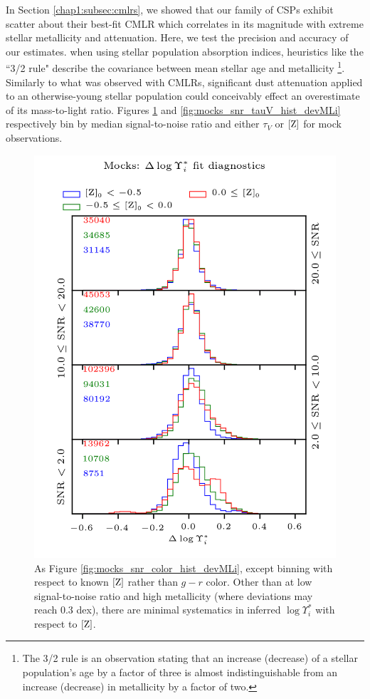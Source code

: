 In Section \ref{chap1:subsec:cmlrs}, we showed that our family of CSPs exhibit scatter about their best-fit CMLR which correlates in its magnitude with extreme stellar metallicity and attenuation. Here, we test the precision and accuracy of our  estimates. when using stellar population absorption indices, heuristics like the ``3/2 rule" describe the covariance between mean stellar age and metallicity \citep{worthey_94}\footnote{The 3/2 rule is an observation stating that an increase (decrease) of a stellar population's age by a factor of three is almost indistinguishable from an increase (decrease) in metallicity by a factor of two.}. Similarly to what was observed with CMLRs, significant dust attenuation applied to an otherwise-young stellar population could conceivably effect an overestimate of its mass-to-light ratio. Figures \ref{fig:mocks_snr_Z_hist_devMLi} and \ref{fig:mocks_snr_tauV_hist_devMLi} respectively bin  by median signal-to-noise ratio and either $\tau_V$ or ${\rm [Z]}$ for mock observations.

\begin{figure}
    \centering
    \includegraphics{mocks_snr_Z_hist_devMLi}
    \caption[\fixspacing As Figure \ref{fig:mocks_snr_color_hist_devMLi}, except binning with respect to known ${\rm [Z]}$]{\fixspacing As Figure \ref{fig:mocks_snr_color_hist_devMLi}, except binning with respect to known ${\rm [Z]}$ rather than $g-r$ color. Other than at low signal-to-noise ratio and high metallicity (where deviations may reach 0.3 dex), there are minimal systematics in inferred $\log \Upsilon^*_i$ with respect to ${\rm [Z]}$.}
    \label{fig:mocks_snr_Z_hist_devMLi}
\end{figure}

